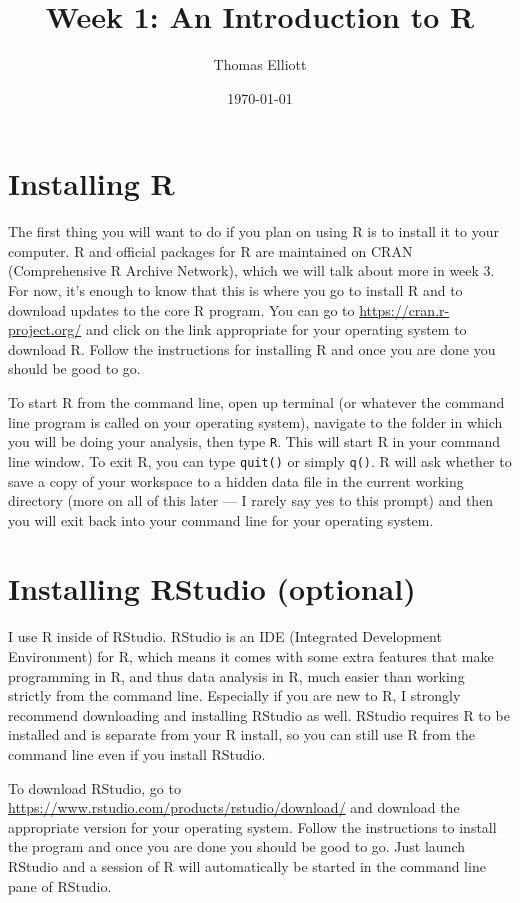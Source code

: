 \documentclass[12pt, oneside]{amsart}   	%
\title{Week 1: An Introduction to R}
\author{Thomas Elliott}
\date{\today}							%
\begin{document}
\maketitle
\lstset{language=R}

\section{Installing R}

The first thing you will want to do if you plan on using R is to install it to your computer. R and official packages for R are maintained on CRAN (Comprehensive R Archive Network), which we will talk about more in week 3. For now, it's enough to know that this is where you go to install R and to download updates to the core R program. You can go to \url{https://cran.r-project.org/} and click on the link appropriate for your operating system to download R. Follow the instructions for installing R and once you are done you should be good to go.

To start R from the command line, open up terminal (or whatever the command line program is called on your operating system), navigate to the folder in which you will be doing your analysis, then type \texttt{R}. This will start R in your command line window. To exit R, you can type \texttt{quit()} or simply \texttt{q()}. R will ask whether to save a copy of your workspace to a hidden data file in the current working directory (more on all of this later --- I rarely say yes to this prompt) and then you will exit back into your command line for your operating system.

\section{Installing RStudio (optional)}

I use R inside of RStudio. RStudio is an IDE (Integrated Development Environment) for R, which means it comes with some extra features that make programming in R, and thus data analysis in R, much easier than working strictly from the command line. Especially if you are new to R, I strongly recommend downloading and installing RStudio as well. RStudio requires R to be installed and is separate from your R install, so you can still use R from the command line even if you install RStudio.

To download RStudio, go to \url{https://www.rstudio.com/products/rstudio/download/} and download the appropriate version for your operating system. Follow the instructions to install the program and once you are done you should be good to go. Just launch RStudio and a session of R will automatically be started in the command line pane of RStudio.
\end{document}
